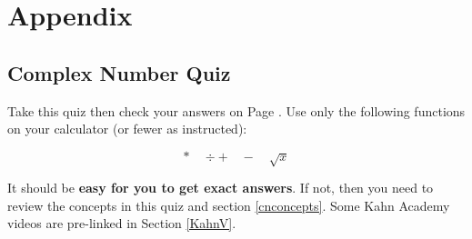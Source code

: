 




\newpage
\chapter{Appendix}


\section{Complex Number Quiz}\label{ComplexNumberQuiz}
Take this quiz then check your answers on Page \pageref{CN_answers}.  Use only the following functions on your calculator (or fewer as instructed):

\[
* \quad \div + \quad - \quad \sqrt{x}
\]


It should be {\bf easy for you to get exact answers}.  If not, then you need to review the concepts in this quiz and section \ref{cnconcepts}.   Some Kahn Academy videos are pre-linked in Section \ref{KahnV}.


